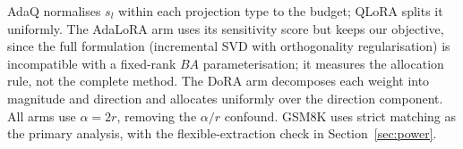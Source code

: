 \documentclass[preprint,12pt]{elsarticle}
\begin{document}
AdaQ normalises $s_l$ within each projection type to the budget; QLoRA splits it uniformly. The AdaLoRA arm uses its sensitivity score but keeps our objective, since the full formulation (incremental SVD with orthogonality regularisation) is incompatible with a fixed-rank $BA$ parameterisation; it measures the allocation rule, not the complete method. The DoRA arm decomposes each weight into magnitude and direction and allocates uniformly over the direction component. All arms use $\alpha = 2r$, removing the $\alpha/r$ confound. GSM8K uses strict matching as the primary analysis, with the flexible-extraction check in Section~\ref{sec:power}.

\setlength{\bibsep}{1pt}


\end{document}
